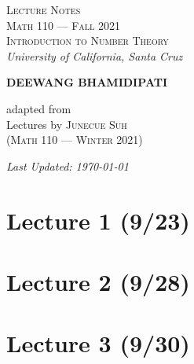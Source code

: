 
 

 
 
\begin{titlepage}
    \centering
    \vspace*{\fill}

	\vspace{-2in}

    {\Huge
    \textsc{Lecture Notes}}\\
    \vspace{0.1in}
	{\Large
	\textsc{Math 110 --- Fall 2021\\[0.5em] Introduction to Number Theory}}\\
	\vspace{0.5in}    
    {\Large
    \textsl{University of California, Santa Cruz}}
	
    \vspace*{0.5in}

	\Large    
    \textbf{DEEWANG BHAMIDIPATI}
	
    \vspace*{0.5in}

	{{adapted from}\\
	\Large    
    Lectures by
	\textsc{Junecue Suh}\\
	{\normalsize(\textsc{Math 110 --- Winter 2021)}}}

	\vspace*{\fill}
	{\normalsize    
    \textsl{Last Updated: \today}}
    \end{titlepage}
    
\tableofcontents
\pagebreak

\section{Lecture 1 (9/23)}

\newpage

\section{Lecture 2 (9/28)}

\newpage

\section{Lecture 3 (9/30)}

\newpage

